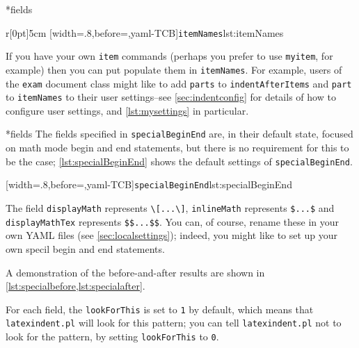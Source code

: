 *{fields} 
\begin{wrapfigure}[5]{r}[0pt]{5cm}
[width=.8\linewidth,before=\centering,yaml-TCB]{\texttt{itemNames}}{lst:itemNames}
\end{wrapfigure}
If you have your own \texttt{item} commands (perhaps you
prefer to use \texttt{myitem}, for example)
then you can put populate them in \texttt{itemNames}.
For example, users of the \texttt{exam} document class might like to add
\texttt{parts} to \texttt{indentAfterItems} and \texttt{part} to \texttt{itemNames}
to their user settings--see \vref{sec:indentconfig} for details of how to configure user settings,
and \vref{lst:mysettings} in particular.\label{page:examsettings}

*{fields}
The fields specified in \texttt{specialBeginEnd} are, in their default state, focused on math mode begin and end statements, but 
there is no requirement for this to be the case; \cref{lst:specialBeginEnd} shows the 
default settings of \texttt{specialBeginEnd}.

[width=.8\linewidth,before=\centering,yaml-TCB]{\texttt{specialBeginEnd}}{lst:specialBeginEnd}

    The field \texttt{displayMath} represents \lstinline!\[...\]!, \texttt{inlineMath} represents
    \lstinline!$...$! and \texttt{displayMathTex} represents \lstinline!$$...$$!. You can, of course, 
    rename these in your own YAML files (see \vref{sec:localsettings}); indeed, you 
    might like to set up your own specil begin and end statements.

    A demonstration of the before-and-after results are shown in \cref{lst:specialbefore,lst:specialafter}.

\begin{minipage}{.45\textwidth}
\end{minipage}%
\hfill
\begin{minipage}{.45\textwidth}
\end{minipage}

For each field, the \texttt{lookForThis} is set to \texttt{1} by default, which means that \texttt{latexindent.pl}
will look for this pattern; you can tell \texttt{latexindent.pl} not to look for the pattern, by setting 
\texttt{lookForThis} to \texttt{0}. 

